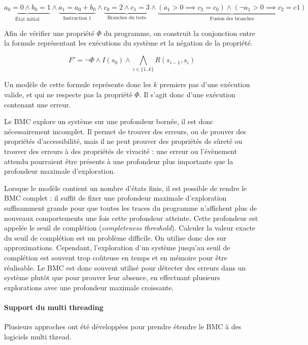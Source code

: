 \[
  \underbrace{a_0 = 0 \land b_0 = 1}_\text{État initial} \land
  \underbrace{a_1 = a_0 + b_0}_\text{Instruction 1} \land
  \underbrace{c_0 = 2 \land c_1 = 3}_\text{Branches du tests} \land
  \underbrace{(a_1 > 0 \implies c_2 = c_0)
    \land (\lnot a_1 > 0 \implies c_2 = c1)
  }_\text{Fusion des branches}
\]


Afin de vérifier une propriété \(\Phi\) du programme, on construit la
conjonction entre la formule représentant les exécutions du système et la
négation de la propriété.

\[
F' = \lnot \Phi \land I(s_0) \land \bigwedge_{i\in \{1..k\}} R(s_{i-1}, s_i)
\]

Un modèle de cette formule représente donc les \(k\) premiers pas d'une
exécution valide, et qui ne respecte pas la propriété \(\Phi\). Il s'agit donc
d'une exécution contenant une erreur.

Le \ac{BMC} explore un système sur une profondeur bornée, il est donc nécessairement
incomplet. Il permet de trouver des erreurs, ou de prouver des propriétés
d'accessibilité, mais il ne peut prouver des propriétés de sûreté ou trouver des
erreurs à des propriétés de vivacité : une erreur ou l'évènement attendu
pourraient être présents à une profondeur plus importante que la profondeur
maximale d'exploration.

Lorsque le modèle contient un nombre d'états finis, il est possible de rendre le
\ac{BMC} complet : il suffit de fixer une profondeur maximale d'exploration
suffisamment grande pour que toutes les traces du programme n'affichent plus de
nouveaux comportements une fois cette profondeur atteinte. Cette profondeur est appelée le seuil de
complétion (\emph{completeness threshold}). Calculer la valeur exacte du seuil de
complétion est un problème difficile. On utilise donc des sur approximations.
Cependant, l'exploration d'un système jusqu'au seuil de complétion est souvent
trop coûteuse en temps et en mémoire pour être réalisable. Le \ac{BMC} est donc
souvent utilisé pour détecter des erreurs dans un système plutôt que pour
prouver leur absence, en effectuant plusieurs explorations avec une profondeur
maximale croissante.

\paragraph{Support du multi threading}

Plusieurs approches ont été développées pour prendre étendre le \ac{BMC} à des
logiciels multi thread\cite{ESBMC_multithread}.


